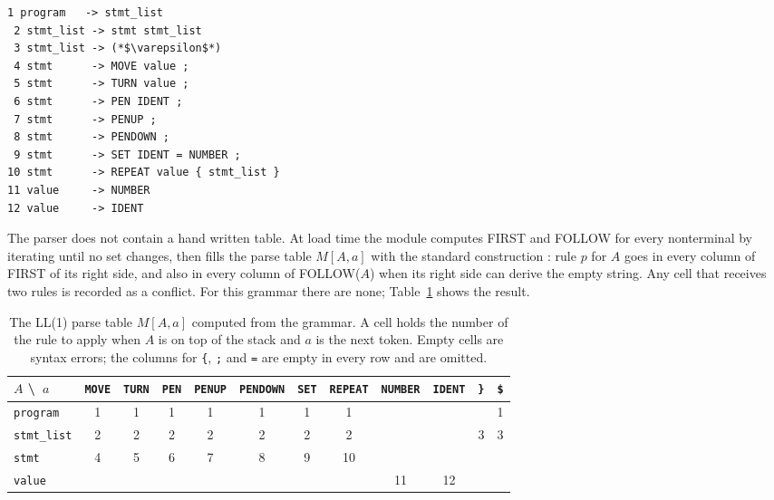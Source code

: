 \documentclass[conference]{IEEEtran}
\begin{document}
\begin{lstlisting}[style=plain, caption={The grammar: twelve rules}, label={lst:grammar}, float=t]
 1 program   -> stmt_list
 2 stmt_list -> stmt stmt_list
 3 stmt_list -> (*$\varepsilon$*)
 4 stmt      -> MOVE value ;
 5 stmt      -> TURN value ;
 6 stmt      -> PEN IDENT ;
 7 stmt      -> PENUP ;
 8 stmt      -> PENDOWN ;
 9 stmt      -> SET IDENT = NUMBER ;
10 stmt      -> REPEAT value { stmt_list }
11 value     -> NUMBER
12 value     -> IDENT
\end{lstlisting}

The parser does not contain a hand written table. At load time the module computes FIRST and FOLLOW for every nonterminal by iterating until no set changes, then fills the parse table $M[A,a]$ with the standard construction \cite{aho2006}: rule $p$ for $A$ goes in every column of FIRST of its right side, and also in every column of FOLLOW($A$) when its right side can derive the empty string. Any cell that receives two rules is recorded as a conflict. For this grammar there are none; Table~\ref{tab:ll1} shows the result.

\begin{table}[t]
\caption{The LL(1) parse table $M[A,a]$ computed from the grammar. A cell holds the number of the rule to apply when $A$ is on top of the stack and $a$ is the next token. Empty cells are syntax errors; the columns for \texttt{\{}, \texttt{;} and \texttt{=} are empty in every row and are omitted.}
\label{tab:ll1}
\centering
\footnotesize
\begin{tabular}{@{}l *{11}{c}@{}}
\toprule
$A$ \textbackslash\ $a$ & \texttt{MOVE} & \texttt{TURN} & \texttt{PEN} & \texttt{PENUP} & \texttt{PENDOWN} & \texttt{SET} & \texttt{REPEAT} & \texttt{NUMBER} & \texttt{IDENT} & \texttt{\}} & \texttt{\$} \\
\midrule
\texttt{program}   & 1 & 1 & 1 & 1 & 1 & 1 & 1 &    &    &   & 1 \\
\texttt{stmt\_list} & 2 & 2 & 2 & 2 & 2 & 2 & 2 &    &    & 3 & 3 \\
\texttt{stmt}      & 4 & 5 & 6 & 7 & 8 & 9 & 10 &   &    &   &   \\
\texttt{value}     &   &   &   &   &   &   &    & 11 & 12 &   &   \\
\bottomrule
\end{tabular}
\end{table}
\end{document}
